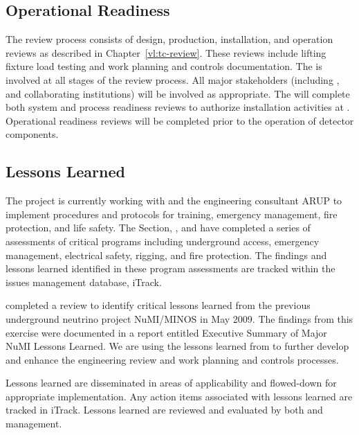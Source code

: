 
\subsection{Operational Readiness}

The  review process consists of design, production,
installation, and operation reviews as described in
Chapter~\ref{vl:tc-review}. These reviews include lifting fixture
load testing and work planning and controls documentation. The
   is involved at all stages of the review
process. All major stakeholders (including ,  and
 collaborating institutions) will be involved as
appropriate. The   will complete both system and process
readiness reviews to authorize installation activities at
.  Operational readiness reviews will be completed prior
 to the operation of detector components.

\subsection{Lessons Learned}

The  project is currently working with  and the 
engineering consultant ARUP to implement  procedures and
protocols for training, emergency management, fire
protection, and life safety. The \fnal {} Section, , and
  have completed a series of assessments of
critical   programs including underground access,
emergency management, electrical safety, rigging, and fire
protection. The findings and lessons learned identified in these
 program assessments are tracked within the \fnal issues management
database, iTrack.

 completed a review to
identify critical lessons learned from the previous underground
neutrino project NuMI/MINOS  in May 2009. The findings from this
exercise were documented in a report entitled Executive Summary of
Major NuMI Lessons Learned.  We are using the  lessons learned from
to further develop and enhance
the  engineering review and work planning and controls
processes.

Lessons learned are disseminated in areas of applicability and
flowed-down for appropriate implementation. Any action items
associated with lessons learned are tracked in iTrack. Lessons learned
are reviewed and evaluated by both  and  management.

\begin{comment}
The \dword{lbnf} project is presently implementing \dword{esh}
programs required for site access, training, work planning, and
emergency management for construction activities on the \dword{surf}
site. During the implementation of these programs, lessons learned will
be identified and addressed to improve the implementation of the \dword{lbnf-dune}
\dword{esh} programs.  The \dword{esh} programs will be fully
established and implemented when \dword{dune} activities start at
\dword{surf}.
\end{comment}